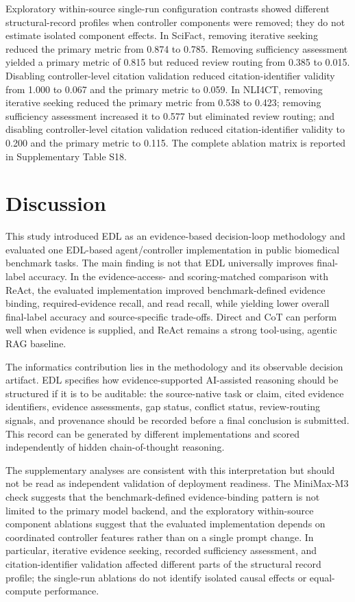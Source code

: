 \documentclass[11pt,a4paper]{article}
\begin{document}
Exploratory within-source single-run configuration contrasts showed different structural-record profiles when controller components were removed; they do not estimate isolated component effects. In SciFact, removing iterative seeking reduced the primary metric from 0.874 to 0.785. Removing sufficiency assessment yielded a primary metric of 0.815 but reduced review routing from 0.385 to 0.015. Disabling controller-level citation validation reduced citation-identifier validity from 1.000 to 0.067 and the primary metric to 0.059. In NLI4CT, removing iterative seeking reduced the primary metric from 0.538 to 0.423; removing sufficiency assessment increased it to 0.577 but eliminated review routing; and disabling controller-level citation validation reduced citation-identifier validity to 0.200 and the primary metric to 0.115. The complete ablation matrix is reported in Supplementary Table S18.

\section{Discussion}

This study introduced EDL as an evidence-based decision-loop methodology and evaluated one EDL-based agent/controller implementation in public biomedical benchmark tasks. The main finding is not that EDL universally improves final-label accuracy. In the evidence-access- and scoring-matched comparison with ReAct, the evaluated implementation improved benchmark-defined evidence binding, required-evidence recall, and read recall, while yielding lower overall final-label accuracy and source-specific trade-offs. Direct and CoT can perform well when evidence is supplied, and ReAct remains a strong tool-using, agentic RAG baseline.

The informatics contribution lies in the methodology and its observable decision artifact. EDL specifies how evidence-supported AI-assisted reasoning should be structured if it is to be auditable: the source-native task or claim, cited evidence identifiers, evidence assessments, gap status, conflict status, review-routing signals, and provenance should be recorded before a final conclusion is submitted. This record can be generated by different implementations and scored independently of hidden chain-of-thought reasoning.

The supplementary analyses are consistent with this interpretation but should not be read as independent validation of deployment readiness. The MiniMax-M3 check suggests that the benchmark-defined evidence-binding pattern is not limited to the primary model backend, and the exploratory within-source component ablations suggest that the evaluated implementation depends on coordinated controller features rather than on a single prompt change. In particular, iterative evidence seeking, recorded sufficiency assessment, and citation-identifier validation affected different parts of the structural record profile; the single-run ablations do not identify isolated causal effects or equal-compute performance.
\end{document}
